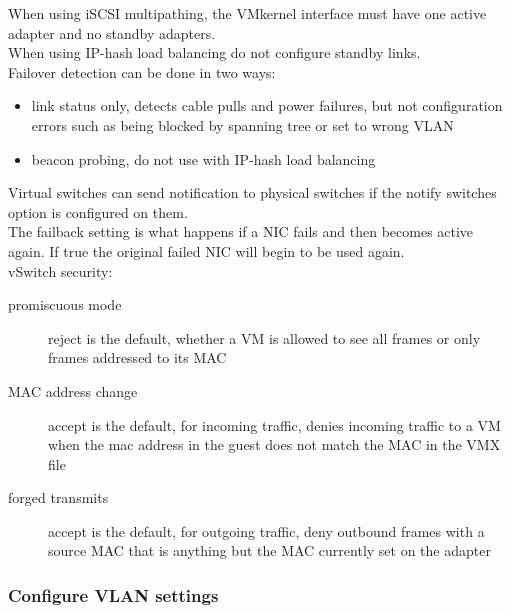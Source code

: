 When using iSCSI multipathing, the VMkernel interface must have one active
adapter and no standby adapters.\\

When using IP-hash load balancing do not configure standby links.\\

Failover detection can be done in two ways:

\begin{itemize}

\item link status only, detects cable pulls and power failures, but not
configuration errors such as being blocked by spanning tree or set to wrong
VLAN

\item beacon probing, do not use with IP-hash load balancing

\end{itemize}

Virtual switches can send notification to physical switches if the notify
switches option is configured on them.\\

The failback setting is what happens if a NIC fails and then becomes active
again. If true the original failed NIC will begin to be used again.\\

vSwitch security:

\begin{description}

\item[promiscuous mode]
reject is the default, whether a VM is allowed to see all frames or only
frames addressed to its MAC

\item[MAC address change]
accept is the default, for incoming traffic, denies incoming traffic to a VM
when the mac address in the guest does not match the MAC in the VMX file

\item[forged transmits]
accept is the default, for outgoing traffic, deny outbound frames with a
source MAC that is anything but the MAC currently set on the adapter

\end{description}

\subsubsection{Configure VLAN settings}

